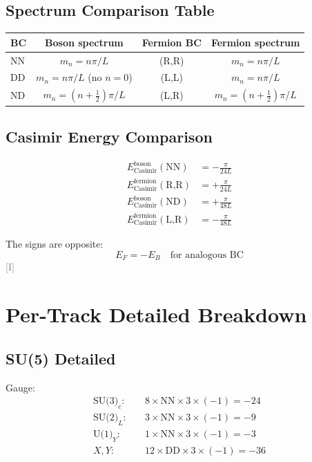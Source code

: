 \documentclass[11pt,a4paper]{article}
\newcommand{\tagI}{\textcolor{gray}{[I]}}
\begin{document}
\subsection{Spectrum Comparison Table}

\begin{center}
\begin{tabular}{lccc}
\toprule
BC & Boson spectrum & Fermion BC & Fermion spectrum \\
\midrule
NN & $m_n = n\pi/L$ & (R,R) & $m_n = n\pi/L$ \\
DD & $m_n = n\pi/L$ (no $n=0$) & (L,L) & $m_n = n\pi/L$ \\
ND & $m_n = (n+\frac{1}{2})\pi/L$ & (L,R) & $m_n = (n+\frac{1}{2})\pi/L$ \\
\bottomrule
\end{tabular}
\end{center}

\subsection{Casimir Energy Comparison}

\begin{align}
\label{eq:app-E-NN}
E_{\text{Casimir}}^{\text{boson}}(\text{NN}) &= -\frac{\pi}{24L} \\
\label{eq:app-E-RR}
E_{\text{Casimir}}^{\text{fermion}}(\text{R,R}) &= +\frac{\pi}{24L} \\
\label{eq:app-E-ND}
E_{\text{Casimir}}^{\text{boson}}(\text{ND}) &= +\frac{\pi}{48L} \\
\label{eq:app-E-LR}
E_{\text{Casimir}}^{\text{fermion}}(\text{L,R}) &= -\frac{\pi}{48L}
\end{align}

The signs are opposite:
\begin{equation}
\label{eq:app-sign-opposite}
E_F = -E_B \quad \text{for analogous BC}
\end{equation}
\tagI

\section{Per-Track Detailed Breakdown}
\label{app:breakdown}

\subsection{SU(5) Detailed}

Gauge:
\begin{align}
\label{eq:app-su5-g1}
\text{SU(3)}_c: \quad &8 \times \text{NN} \times 3 \times (-1) = -24 \\
\label{eq:app-su5-g2}
\text{SU(2)}_L: \quad &3 \times \text{NN} \times 3 \times (-1) = -9 \\
\label{eq:app-su5-g3}
\text{U(1)}_Y: \quad &1 \times \text{NN} \times 3 \times (-1) = -3 \\
\label{eq:app-su5-g4}
X, Y: \quad &12 \times \text{DD} \times 3 \times (-1) = -36
\end{align}
\end{document}
